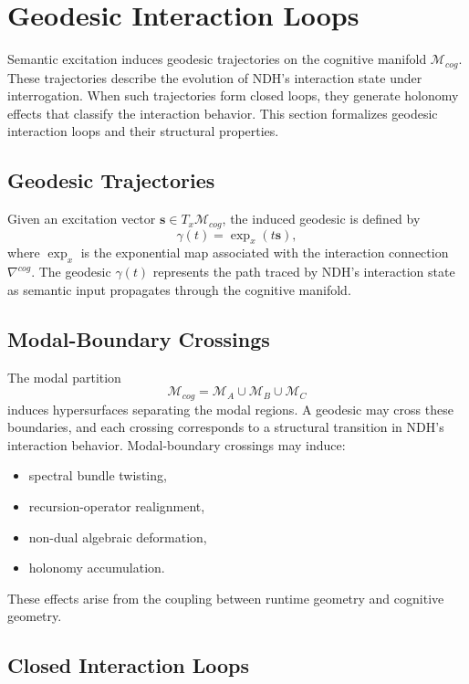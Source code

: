 \section{Geodesic Interaction Loops}
\label{sec:geodesic-loops}

Semantic excitation induces geodesic trajectories on the cognitive manifold
$\mathcal{M}_{cog}$. These trajectories describe the evolution of NDH's
interaction state under interrogation. When such trajectories form closed
loops, they generate holonomy effects that classify the interaction behavior.
This section formalizes geodesic interaction loops and their structural
properties.

\subsection{Geodesic Trajectories}

Given an excitation vector $\mathbf{s} \in T_x \mathcal{M}_{cog}$, the induced
geodesic is defined by
\[
\gamma(t) = \exp_x(t\mathbf{s}),
\]
where $\exp_x$ is the exponential map associated with the interaction
connection $\nabla^{cog}$. The geodesic $\gamma(t)$ represents the path traced
by NDH's interaction state as semantic input propagates through the cognitive
manifold.

\subsection{Modal-Boundary Crossings}

The modal partition
\[
\mathcal{M}_{cog} = \mathcal{M}_A \cup \mathcal{M}_B \cup \mathcal{M}_C
\]
induces hypersurfaces separating the modal regions. A geodesic may cross these
boundaries, and each crossing corresponds to a structural transition in NDH's
interaction behavior. Modal-boundary crossings may induce:

\begin{itemize}
    \item spectral bundle twisting,
    \item recursion-operator realignment,
    \item non-dual algebraic deformation,
    \item holonomy accumulation.
\end{itemize}

These effects arise from the coupling between runtime geometry and cognitive
geometry.

\subsection{Closed Interaction Loops}

